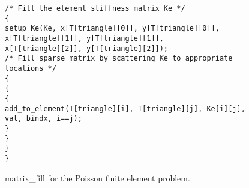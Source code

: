 \begin{figure}[p]
{\begin{minipage}{6.2in}
\begin{tabbing}
\in\tt/* Fill the element stiffness matrix Ke */\\[1em]

\{\\
\>\>\tt setup\_Ke(Ke, x[T[triangle][0]], y[T[triangle][0]],\\
\>\>\hskip 1.1in  \tt x[T[triangle][1]], y[T[triangle][1]],\\
\>\>\hskip 1.1in  \tt x[T[triangle][2]], y[T[triangle][2]]);\\[1em]


\in\tt/* Fill sparse matrix by scattering Ke to appropriate locations */\\[1em]

\> \{\\
\>\>\{\\
\>\>\> \underline{\{}\\
\>\>\>\>\in\tt   add\_to\_element(T[triangle][i], T[triangle][j], Ke[i][j],\\
\hskip 2.18in     \tt              val, bindx, i==j);\\
\>\>\>\>   \}\\
\>\>\>  \}\\
\>\> \}\\
\> \}\\
\end{tabbing}
\vspace{0.1em}
\end{minipage}}
\caption{{\sf matrix\_fill} for the Poisson finite element
problem.}\label{matrix_fill_fem}
\vspace{-8em}
\end{figure}

